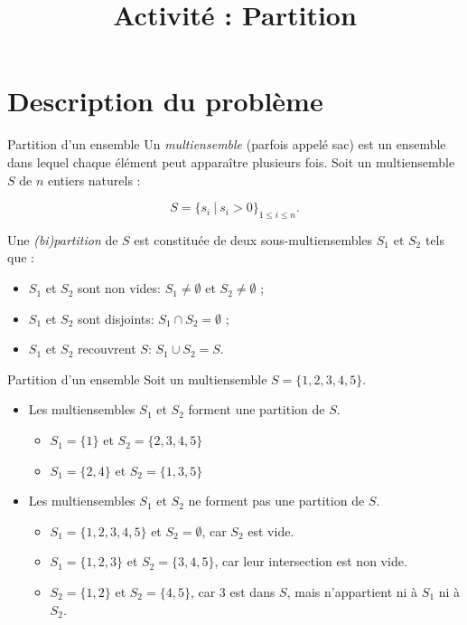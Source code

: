 \documentclass[11pt]{article}
\title{Activité : Partition}
\date{}
\newif\ifdraftmode
\begin{document}
\ifdraftmode
\selectcolormodel{gray}
\fi

\maketitle
\tableofcontents

\section{Description du problème}

  \begin{definition}{Partition d'un ensemble}
    Un \emph{multiensemble} (parfois appelé sac) est un ensemble dans lequel chaque élément peut apparaître plusieurs fois.
    Soit un multiensemble $S$ de $n$ entiers naturels :

    $$S = \{s_i\ |\ s_i > 0\}_{1\leq i \leq n}.$$

    Une \emph{(bi)partition} de $S$ est constituée de deux sous-multiensembles $S_1$ et $S_2$ tels que :
    \begin{itemize}
      \item $S_1$ et $S_2$ sont non vides:  $S_1 \neq \emptyset$ et $S_2 \neq \emptyset$ ;
      \item $S_1$ et $S_2$ sont disjoints:  $S_1 \cap S_2 = \emptyset$ ;
      \item $S_1$ et $S_2$ recouvrent $S$:  $S_1 \cup S_2 = S$.
    \end{itemize}
  \end{definition}

  \begin{exemple}{Partition d'un ensemble}
    Soit un multiensemble $S = \{1,2,3,4,5\}$.
    \begin{itemize}
      \item Les multiensembles $S_1$ et $S_2$ forment une partition de $S$.
        \begin{itemize}
          \item $S_1 = \{1\}$ et $S_2 = \{2,3,4,5\}$
          \item $S_1 = \{2, 4\}$ et $S_2 = \{1,3,5\}$
        \end{itemize}
      \item Les multiensembles $S_1$ et $S_2$ ne forment pas une partition de $S$.
        \begin{itemize}
          \item $S_1 = \{1,2,3,4,5\}$ et $S_2 = \emptyset$, car $S_2$ est vide.
          \item $S_1 = \{1,2,3\}$ et $S_2 = \{3,4,5\}$, car leur intersection est non vide.
          \item $S_2 = \{1,2\}$ et $S_2 = \{4, 5\}$, car 3 est dans $S$, mais n'appartient ni à $S_1$ ni à $S_2$.
        \end{itemize}
    \end{itemize}
  \end{exemple}
\end{document}
